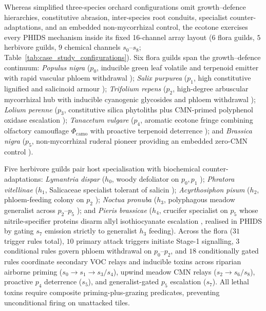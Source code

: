 Whereas simplified three-species orchard configurations omit growth--defence hierarchies, constitutive abrasion, inter-species root conduits, specialist counter-adaptations, and an embedded non-mycorrhizal control, the ecotone exercises every PHIDS mechanism inside its fixed 16-channel array layout ($6$ flora guilds, $5$ herbivore guilds, $9$ chemical channels $s_0$--$s_8$; Table~\ref{tab:case_study_configurations}). Six flora guilds span the growth--defence continuum: \textit{Populus nigra} ($p_0$, inducible green leaf volatile and terpenoid emitter with rapid vascular phloem withdrawal \cite{babst2005jasmonic, frost2008priming}); \textit{Salix purpurea} ($p_1$, high constitutive lignified and salicinoid armour \cite{boeckler2011phenolic, kayser2025pharmaceutical}); \textit{Trifolium repens} ($p_2$, high-degree arbuscular mycorrhizal hub with inducible cyanogenic glycosides and phloem withdrawal \cite{babikova2013underground, olsen2021dual, shen2023between, li2025common}); \textit{Lolium perenne} ($p_3$, constitutive silica phytoliths plus CMN-primed polyphenol oxidase escalation \cite{massey2006silica, shen2023between, li2025common}); \textit{Tanacetum vulgare} ($p_4$, aromatic ecotone fringe combining olfactory camouflage $\Phi_{\text{camo}}$ with proactive terpenoid deterrence \cite{clancy2016chemotypic}); and \textit{Brassica nigra} ($p_5$, non-mycorrhizal ruderal pioneer providing an embedded zero-CMN control \cite{schreiner1993stimulation, bekaert2012metabolic}).

Five herbivore guilds pair host specialisation with biochemical counter-adaptations: \textit{Lymantria dispar} ($h_0$, woody defoliator on $p_0, p_1$ \cite{lindroth2024forest}); \textit{Phratora vitellinae} ($h_1$, Salicaceae specialist tolerant of salicin \cite{pasteels1983salicin, kuhn2004selective}); \textit{Acyrthosiphon pisum} ($h_2$, phloem-feeding colony on $p_2$ \cite{shih2023pea}); \textit{Noctua pronuba} ($h_3$, polyphagous meadow generalist across $p_2$--$p_5$ \cite{topping2025noctua}); and \textit{Pieris brassicae} ($h_4$, crucifer specialist on $p_5$ whose nitrile-specifier proteins disarm allyl isothiocyanate escalation \cite{okamura2022testing}, realised in PHIDS by gating $s_7$ emission strictly to generalist $h_3$ feeding). Across the flora ($31$ trigger rules total), $10$ primary attack triggers initiate Stage-1 signalling, $3$ conditional rules govern phloem withdrawal on $p_0$--$p_2$, and $18$ conditionally gated rules coordinate secondary VOC relays and inducible toxins across riparian airborne priming ($s_0 \to s_1 \to s_3/s_4$), upwind meadow CMN relays ($s_2 \to s_6/s_8$), proactive $p_4$ deterrence ($s_5$), and generalist-gated $p_5$ escalation ($s_7$). All lethal toxins require composite priming-plus-grazing predicates, preventing unconditional firing on unattacked tiles.

